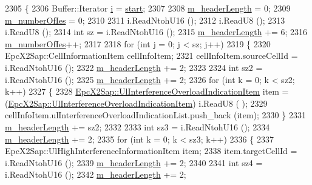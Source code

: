 \begin{DoxyCode}
2305 \{
2306   Buffer::Iterator \hyperlink{bernuolliDistribution_8m_a6f6ccfcf58b31cb6412107d9d5281426}{i} = \hyperlink{namespacevisualizer_1_1core_a2a35e5d8a34af358b508dac8635754e0}{start};
2307 
2308   \hyperlink{classns3_1_1EpcX2LoadInformationHeader_a030cb883d52be9e5113a205d4376354c}{m\_headerLength} = 0;
2309   \hyperlink{classns3_1_1EpcX2LoadInformationHeader_ad2d2b6940608e6f5a4a5228ed8cb1d2c}{m\_numberOfIes} = 0;
2310 
2311   i.ReadNtohU16 ();
2312   i.ReadU8 ();
2313   i.ReadU8 ();
2314   \textcolor{keywordtype}{int} sz = i.ReadNtohU16 ();
2315   \hyperlink{classns3_1_1EpcX2LoadInformationHeader_a030cb883d52be9e5113a205d4376354c}{m\_headerLength} += 6;
2316   \hyperlink{classns3_1_1EpcX2LoadInformationHeader_ad2d2b6940608e6f5a4a5228ed8cb1d2c}{m\_numberOfIes}++;
2317 
2318   \textcolor{keywordflow}{for} (\textcolor{keywordtype}{int} j = 0; j < sz; j++)
2319     \{
2320       EpcX2Sap::CellInformationItem cellInfoItem;
2321       cellInfoItem.sourceCellId = i.ReadNtohU16 ();
2322       \hyperlink{classns3_1_1EpcX2LoadInformationHeader_a030cb883d52be9e5113a205d4376354c}{m\_headerLength} += 2;
2323 
2324       \textcolor{keywordtype}{int} sz2 = i.ReadNtohU16 ();
2325       \hyperlink{classns3_1_1EpcX2LoadInformationHeader_a030cb883d52be9e5113a205d4376354c}{m\_headerLength} += 2;
2326       \textcolor{keywordflow}{for} (\textcolor{keywordtype}{int} k = 0; k < sz2; k++)
2327         \{
2328           \hyperlink{classns3_1_1EpcX2Sap_a4b1ca2b446488bf6f640c6cdce42aaf9}{EpcX2Sap::UlInterferenceOverloadIndicationItem} item
       = (\hyperlink{classns3_1_1EpcX2Sap_a4b1ca2b446488bf6f640c6cdce42aaf9}{EpcX2Sap::UlInterferenceOverloadIndicationItem}) i.ReadU8 (
      );
2329           cellInfoItem.ulInterferenceOverloadIndicationList.push\_back (item);
2330         \}
2331       \hyperlink{classns3_1_1EpcX2LoadInformationHeader_a030cb883d52be9e5113a205d4376354c}{m\_headerLength} += sz2;
2332 
2333       \textcolor{keywordtype}{int} sz3 = i.ReadNtohU16 ();
2334       \hyperlink{classns3_1_1EpcX2LoadInformationHeader_a030cb883d52be9e5113a205d4376354c}{m\_headerLength} += 2;
2335       \textcolor{keywordflow}{for} (\textcolor{keywordtype}{int} k = 0; k < sz3; k++)
2336         \{
2337           EpcX2Sap::UlHighInterferenceInformationItem item;
2338           item.targetCellId = i.ReadNtohU16 ();
2339           \hyperlink{classns3_1_1EpcX2LoadInformationHeader_a030cb883d52be9e5113a205d4376354c}{m\_headerLength} += 2;
2340 
2341           \textcolor{keywordtype}{int} sz4 = i.ReadNtohU16 ();
2342           \hyperlink{classns3_1_1EpcX2LoadInformationHeader_a030cb883d52be9e5113a205d4376354c}{m\_headerLength} += 2;

\end{DoxyCode}
